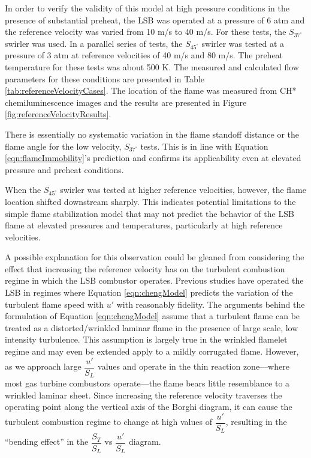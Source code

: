 In order to verify the validity of this model at high pressure conditions in the presence of substantial preheat, the LSB was operated at a pressure of 6 atm and the reference velocity was varied from 10 m/s to 40 m/s.
For these tests, the \(S_{37^\circ}\) swirler was used.
In a parallel series of tests, the \(S_{45^\circ}\) swirler was tested at a pressure of 3 atm at reference velocities of 40 m/s and 80 m/s.
The preheat temperature for these tests was about 500 K.
The measured and calculated flow parameters for these conditions are presented in Table \ref{tab:referenceVelocityCases}.
The location of the flame was measured from CH* chemiluminescence images and the results are presented in Figure \ref{fig:referenceVelocityResults}.

There is essentially no systematic variation in the flame standoff distance or the flame angle for the low velocity, \(S_{37^\circ}\) tests.
This is in line with Equation \ref{eqn:flameImmobility}'s prediction and confirms its applicability even at elevated pressure and preheat conditions.

When the \(S_{45^\circ}\) swirler was tested at higher reference velocities, however, the flame location shifted downstream sharply.
This indicates potential limitations to the simple flame stabilization model that may not predict the behavior of the LSB flame at elevated pressures and temperatures, particularly at high reference velocities.

A possible explanation for this observation could be gleaned from considering the effect that increasing the reference velocity has on the turbulent combustion regime in which the LSB combustor operates.
Previous studies have operated the LSB in regimes where Equation \ref{eqn:chengModel} predicts the variation of the turbulent flame speed with \(u'\) with reasonably fidelity.
The arguments behind the formulation of Equation \ref{eqn:chengModel} assume that a turbulent flame can be treated as a distorted/wrinkled laminar flame in the presence of large scale, low intensity turbulence.
This assumption is largely true in the wrinkled flamelet regime and may even be extended apply to a mildly corrugated flame.
However, as we approach large \(\dfrac{ u' }{ S_L }\) values and operate in the thin reaction zone---where most gas turbine combustors operate---the flame bears little resemblance to a wrinkled laminar sheet.
Since increasing the reference velocity traverses the operating point along the vertical axis of the Borghi diagram, it can cause the turbulent combustion regime to change at high values of \(\dfrac{ u' }{ S_L }\), resulting in the ``bending effect'' in the \(\dfrac{ S_T }{ S_L }\) vs \(\dfrac{ u' }{ S_L }\) diagram.

